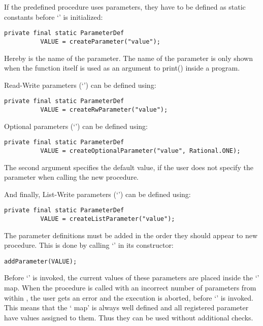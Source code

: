 
If the predefined procedure uses parameters, they have to be defined as static constants before 
`' is initialized:
\begin{lstlisting}[frame=none,numbers=none]
private final static ParameterDef
          VALUE = createParameter("value");
\end{lstlisting}

Hereby  is the name of the parameter. The name of the parameter is only shown when the function itself is used as an argument to print() inside a \SetlX{} program.

Read-Write parameters (`') can be defined using:
\begin{lstlisting}[frame=none,numbers=none]
private final static ParameterDef
          VALUE = createRwParameter("value");
\end{lstlisting}

Optional parameters (`') can be defined using:
\begin{lstlisting}[frame=none,numbers=none]
private final static ParameterDef 
          VALUE = createOptionalParameter("value", Rational.ONE);
\end{lstlisting}
The second argument specifies the default value, if the user does not specify the parameter when calling the new procedure.

And finally, List-Write parameters (`\command{*}') can be defined using:
\begin{lstlisting}[frame=none,numbers=none]
private final static ParameterDef
          VALUE = createListParameter("value");
\end{lstlisting}

The parameter definitions must be added in the order they should appear to new procedure. This is done by calling `' in its constructor:
\begin{lstlisting}[frame=none,numbers=none]
addParameter(VALUE);
\end{lstlisting}


Before `' is invoked, the current values of these parameters are placed inside the `' map.
When the procedure is called with an incorrect number of parameters from within \SetlX{}, the user gets an error and the execution is aborted, before `' is invoked.
This means that the ` map' is always well defined and all registered parameter have values assigned to them.
Thus they can be used without additional checks.

